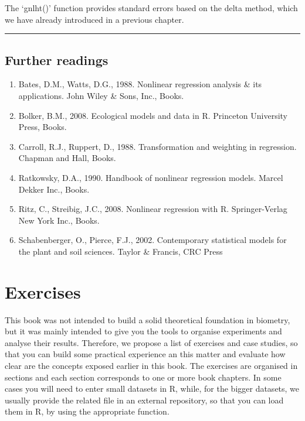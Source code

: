 \documentclass[a4paper,12pt,oneside]{book}
\providecommand{\tightlist}{%
  \setlength{\itemsep}{0pt}\setlength{\parskip}{0pt}}
\begin{document}
The `gnlht()' function provides standard errors based on the delta method, which we have already introduced in a previous chapter.

\begin{center}\rule{0.5\linewidth}{0.5pt}\end{center}

\hypertarget{further-readings-11}{%
\section{Further readings}\label{further-readings-11}}

\begin{enumerate}
\def\labelenumi{\arabic{enumi}.}
\tightlist
\item
  Bates, D.M., Watts, D.G., 1988. Nonlinear regression analysis \& its applications. John Wiley \& Sons, Inc., Books.
\item
  Bolker, B.M., 2008. Ecological models and data in R. Princeton University Press, Books.
\item
  Carroll, R.J., Ruppert, D., 1988. Transformation and weighting in regression. Chapman and Hall, Books.
\item
  Ratkowsky, D.A., 1990. Handbook of nonlinear regression models. Marcel Dekker Inc., Books.
\item
  Ritz, C., Streibig, J.C., 2008. Nonlinear regression with R. Springer-Verlag New York Inc., Books.
\item
  Schabenberger, O., Pierce, F.J., 2002. Contemporary statistical models for the plant and soil sciences. Taylor \& Francis, CRC Press
\end{enumerate}

\hypertarget{exercises}{%
\chapter{Exercises}\label{exercises}}

This book was not intended to build a solid theoretical foundation in biometry, but it was mainly intended to give you the tools to organise experiments and analyse their results. Therefore, we propose a list of exercises and case studies, so that you can build some practical experience an this matter and evaluate how clear are the concepts exposed earlier in this book. The exercises are organised in sections and each section corresponds to one or more book chapters. In some cases you will need to enter small datasets in R, while, for the bigger datasets, we usually provide the related file in an external repository, so that you can load them in R, by using the appropriate function.
\end{document}
